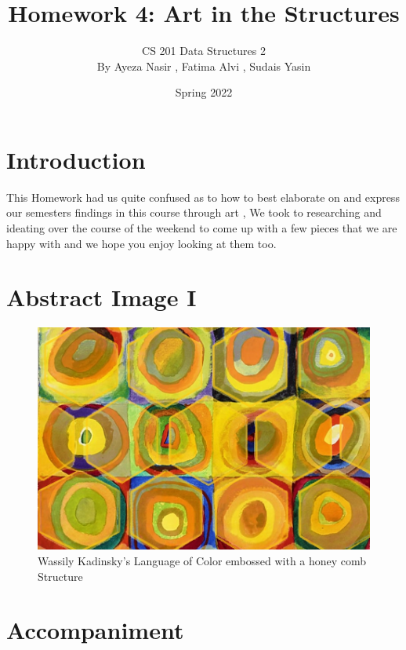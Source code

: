 \documentclass[addpoints]{exam}
\title{Homework 4: Art in the Structures }
\author{CS 201 Data Structures 2\\
By Ayeza Nasir , Fatima Alvi , Sudais Yasin }
\date{Spring 2022}
\begin{document}
\maketitle

\section*{Introduction}
This Homework had us quite confused as to how to best elaborate on and express our semesters findings in this course through art , We took to researching and ideating over the course of the weekend to come up with a few pieces that we are happy with and we hope you enjoy looking at them too. 

\section*{Abstract Image I}

\begin{figure}[h]
\footnotesize  
  
    
        \begin{center}
              \includegraphics[height=.3\textheight, align=c]{myimage1}
        \end{center}
  

  \caption{Wassily Kadinsky's Language of Color embossed with a honey comb Structure} 
  \label{fig:example}
\end{figure}

\section*{Accompaniment}
\end{document}
